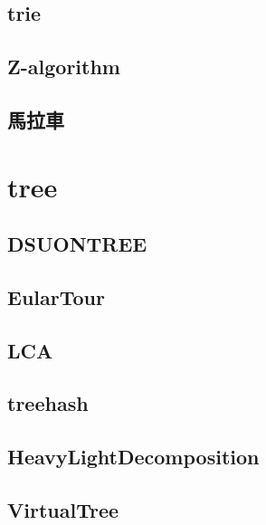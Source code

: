 \documentclass[a4paper,10pt,twocolumn,oneside]{article}
\begin{document}
    \subsection{trie}
    

    \subsection{Z-algorithm}
    

    \subsection{馬拉車}
    

\section{tree}
    \subsection{DSUONTREE}
    

    \subsection{EularTour}
    

    \subsection{LCA}
    

    \subsection{treehash}
    

    \subsection{HeavyLightDecomposition}
    

    \subsection{VirtualTree}
    
\end{document}
